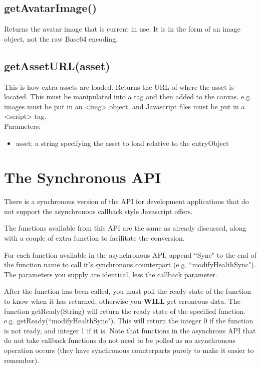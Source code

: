 \documentclass[a4paper,12pt]{article}
\begin{document}
\subsection*{getAvatarImage()}
Returns the avatar image that is current in use. It is in the form of an image object, not the raw Base64 encoding.

\subsection*{getAssetURL(asset)}
This is how extra assets are loaded. Returns the URL of where the asset is located. This must be manipulated into a tag
and then added to the canvas. e.g. images must be put in an <img> object, and Javascript files must be put in
a <script> tag.\\
Parameters:
\begin{itemize}
	\setlength\itemsep{0em}
	\item asset: a string specifying the asset to load relative to the entryObject
\end{itemize}

\section{The Synchronous API}
There is a synchronous version of the API for development applications that do not support the asynchronous callback style Javascript offers.

The functions available from this API are the same as already discussed, along with a couple of extra function to facilitate the conversion.

For each function available in the asynchronous API, append ``Sync" to the end of the function name to call it's synchronous counterpart (e.g. ``modifyHealthSync"). The parameters you supply are identical, less the callback parameter.

After the function has been called, you must poll the ready state of the function to know when it has returned; otherwise you \textbf{WILL} get erroneous data. The function getReady(String) will return the ready state of the specified function. e.g. getReady(``modifyHealthSync"). This will return the integer 0 if the function is not ready, and integer 1 if it is.
Note that functions in the asynchrous API that do not take callback functions do not need to be polled as no asynchronous operation occurs (they have synchronous counterparts purely to make it easier to remember).
\end{document}
